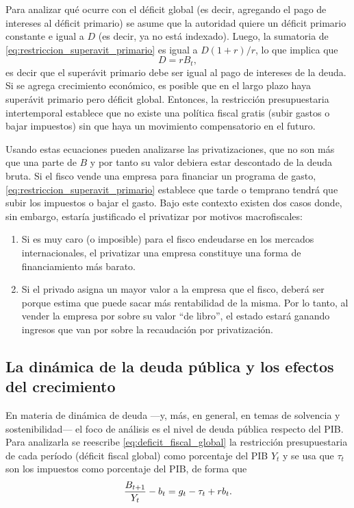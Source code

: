 \documentclass[DeGregorioResumen]{subfiles}
\begin{document}
Para analizar qué ocurre con el déficit global (es decir, agregando el pago de intereses al déficit primario)  se asume que la autoridad quiere un déficit primario constante e igual a $D$ (es decir, ya no está indexado). Luego, la sumatoria de \eqref{eq:restriccion_superavit_primario} es igual a $D(1+r)/r$, lo que implica que
\begin{equation*}
D=rB_t,
\end{equation*}
es decir que el superávit primario debe ser igual al pago de intereses de la deuda. Si se agrega crecimiento económico, es posible que en el largo plazo haya superávit primario pero déficit global. Entonces, la restricción presupuestaria intertemporal establece que no existe una política fiscal gratis (subir gastos o bajar impuestos) sin que haya un movimiento compensatorio en el futuro.

Usando estas ecuaciones pueden analizarse las privatizaciones, que no son más que una parte de $B$ y por tanto su valor debiera estar descontado de la deuda bruta. Si el fisco vende una empresa para financiar un programa de gasto, \eqref{eq:restriccion_superavit_primario} establece que tarde o temprano tendrá que subir los impuestos o bajar el gasto. Bajo este contexto existen dos casos donde, sin embargo, estaría justificado el privatizar por motivos macrofiscales:

\begin{enumerate}
\item Si es muy caro (o imposible) para el fisco endeudarse en los mercados internacionales, el privatizar una empresa constituye una forma de financiamiento más barato.
\item Si el privado asigna un mayor valor a la empresa que el fisco, deberá ser porque estima que puede sacar más rentabilidad de la misma. Por lo tanto, al vender la empresa por sobre su valor ``de libro'', el estado estará ganando ingresos que van por sobre la recaudación por privatización. 
\end{enumerate}

\subsection{La dinámica de la deuda pública y los efectos del crecimiento}

En materia de dinámica de deuda ---y, más, en general, en temas de solvencia y sostenibilidad--- el foco de análisis es el nivel de deuda pública respecto del PIB. Para analizarla se reescribe \eqref{eq:deficit_fiscal_global} la restricción presupuestaria de cada período (déficit fiscal global) como porcentaje del PIB $Y_t$ y se usa que $\tau_t $ son los impuestos como porcentaje del PIB, de forma que
\begin{equation*}
\frac{{B}_{t+1}}{Y_t}-b_t = g_t - \tau_t + rb_t.
\end{equation*}
\end{document}
